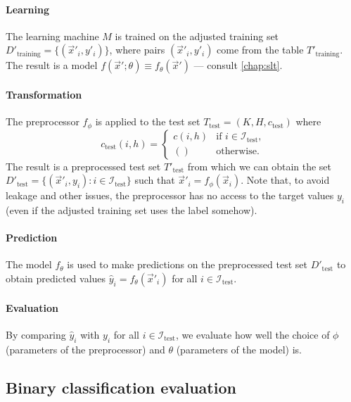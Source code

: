 \paragraph{Learning}

The learning machine $M$ is trained on the adjusted training set $D'_\text{training} =
\{(\vec{x}'_i, y'_i)\}$, where pairs $(\vec{x}'_i, y'_i)$ come from the table
$T'_\text{training}$.  The result is a model $f(\vec{x}'; \theta) \equiv
f_\theta(\vec{x}')$ --- consult \cref{chap:slt}.

\paragraph{Transformation}

The preprocessor $f_\phi$ is applied to the test set $T_\text{test} = (K, H,
c_\text{test})$ where \[
  c_\text{test}(i, h) = \begin{cases}
    c(i, h) & \text{if } i \in \mathcal{I}_\text{test}\text{,} \\
    () & \text{otherwise}\text{.}
  \end{cases}
\]  The result is a preprocessed test set $T'_\text{test}$ from which we can obtain the
set $D'_\text{test} = \{(\vec{x}'_i, y_i) : i \in \mathcal{I}_\text{test}\}$ such
that $\vec{x}'_i = f_\phi(\vec{x}_i)$.  Note that, to avoid \gls{leakage} and other
issues, the preprocessor has no access to the target values $y_i$ (even if the
adjusted training set uses the label somehow).

\paragraph{Prediction}

The model $f_\theta$ is used to make predictions on the preprocessed test set
$D'_\text{test}$ to obtain predicted values $\hat{y}_i = f_\theta(\vec{x}'_i)$ for all
$i \in \mathcal{I}_\text{test}$.

\paragraph{Evaluation}

By comparing $\hat{y}_i$ with $y_i$ for all $i \in \mathcal{I}_\text{test}$, we
evaluate how well the choice of $\phi$ (parameters of the preprocessor) and $\theta$
(parameters of the model) is.

\subsection{Binary classification evaluation}

